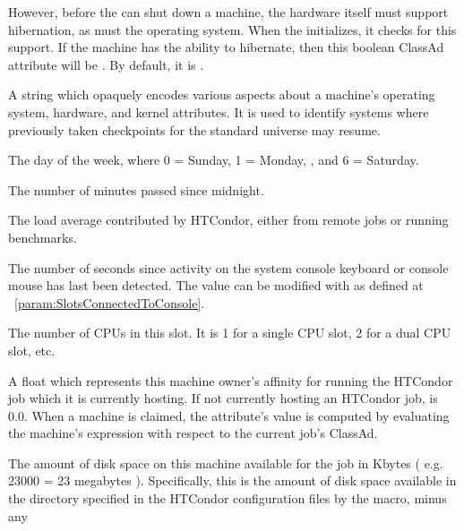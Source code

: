 \begin{description}
However, before the  can shut down a machine, 
the hardware itself must support hibernation, as must the operating system. 
When the  initializes, 
it checks for this support.
If the machine has the ability to hibernate, 
then this boolean ClassAd attribute will be .
By default, it is .
%
\label{CheckpointPlatform-machine-attribute}
\item[\AdAttr{CheckpointPlatform}:] A string which opaquely encodes various
aspects about a machine's operating system, hardware, and kernel
attributes.
It is used to identify systems where previously taken checkpoints for
the standard universe may resume.
%
\item[\AdAttr{ClockDay}:] The day of the week, 
where 0 = Sunday, 1 = Monday, \Dots, and 6 = Saturday. 
%
\item[\AdAttr{ClockMin}:] The number of minutes passed since midnight.
%
\item[\AdAttr{CondorLoadAvg}:] The load average contributed  
by HTCondor, either from remote jobs or running benchmarks.
%
\item[\AdAttr{ConsoleIdle}:] The number of seconds since activity on the system
console keyboard or console mouse has last been detected.
The value can be modified with 
as defined at ~\ref{param:SlotsConnectedToConsole}.
%
\item[\AdAttr{Cpus}:]  The number of CPUs in this slot.
It is 1 for a single CPU slot, 2 for a dual CPU slot, etc.
%
\item[\AdAttr{CurrentRank}:] A float which represents this machine
owner's affinity
for running the HTCondor job which it is currently hosting.  If not
currently hosting an HTCondor job,  is 0.0.
When a machine is claimed,
the attribute's value is computed by evaluating the machine's
 expression with respect to the current job's ClassAd.
%
\item[\AdAttr{Disk}:] The amount of disk space on this machine available for
the job in Kbytes ( e.g. 23000 = 23 megabytes ).  Specifically, this
is the amount of disk space available in the directory specified in
the HTCondor configuration files by the  macro, minus any

\end{description}
